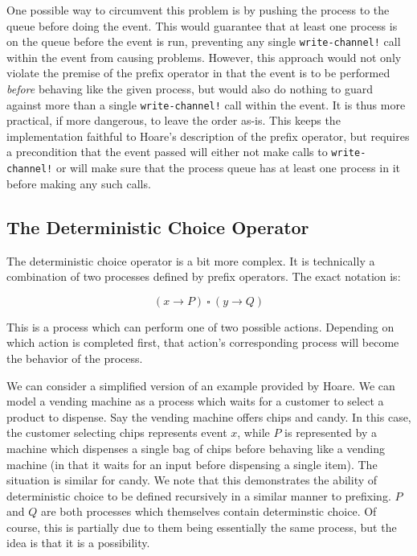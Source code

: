 \documentclass{article}
\begin{document}
One possible way to circumvent this problem is by pushing the process to the queue before doing the event. This would guarantee that at least one process is on the
queue before the event is run, preventing any single \texttt{write-channel!} call within the event from causing problems. However, this approach would not only 
violate the premise of the prefix operator in that the event is to be performed \textit{before} behaving like the given process, but would also do nothing to guard
against more than a single \texttt{write-channel!} call within the event. It is thus more practical, if more dangerous, to leave the order as-is. This keeps the 
implementation faithful to Hoare's description of the prefix operator, but requires a precondition that the event passed will either not make calls to 
\texttt{write-channel!} or will make sure that the process queue has at least one process in it before making any such calls.

\subsection*{The Deterministic Choice Operator}

The deterministic choice operator is a bit more complex. It is technically a combination of two processes defined by prefix operators. The exact notation is:

\[ (x \rightarrow P)\  \square \  (y \rightarrow Q) \]

This is a process which can perform one of two possible actions. Depending on which action is completed first, that action's corresponding process will become the behavior of the process.

We can consider a simplified version of an example provided by Hoare. We can model a vending machine as a process which waits for a customer to select
a product to dispense. Say the vending machine offers chips and candy. In this case, the customer selecting chips represents event $x$, while $P$ is represented by
a machine which dispenses a single bag of chips before behaving like a vending machine (in that it waits for an input before dispensing a single item). The 
situation is similar for candy. We note that this demonstrates the ability of deterministic choice to be defined recursively in a similar manner to prefixing.
$P$ and $Q$ are both processes which themselves contain determinstic choice. Of course, this is partially due to them being essentially the same process, but the
idea is that it is a possibility.
\end{document}
